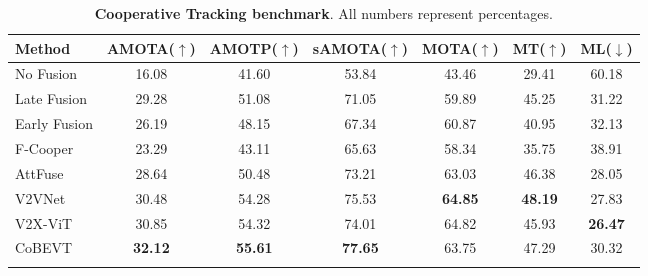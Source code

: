 \begin{table}[!tb]
\centering
\setlength{\tabcolsep}{10pt}
\begin{tabular}{l|c|c|c|c|c|c}
\hline
Method       & AMOTA($\uparrow$) & AMOTP($\uparrow$) & sAMOTA($\uparrow$) & MOTA($\uparrow$)  & MT($\uparrow$)    & ML($\downarrow$)    \\ \hline
No Fusion    & 16.08    & 41.60  & 53.84     & 43.46     &  29.41     &    60.18   \\\arrayrulecolor{lightgray}\hline
Late Fusion  & 29.28 & 51.08 & 71.05  & 59.89 & 45.25 & 31.22    \\\arrayrulecolor{lightgray}\hline
Early Fusion & 26.19 & 48.15 & 67.34  & 60.87  & 40.95 & 32.13 \\\arrayrulecolor{lightgray}\hline
F-Cooper~\cite{chen2019f}    &   23.29 &  43.11   & 65.63    &  58.34     &    35.75  &  38.91        \\
AttFuse~\cite{xu2022opv2v}      & 28.64 & 50.48 & 73.21 &  63.03 & 46.38 & 28.05 \\
V2VNet~\cite{wang2020v2vnet}       & 30.48 & 54.28 & 75.53  & \textbf{64.85}  & \textbf{48.19} & 27.83 \\
V2X-ViT~\cite{xu2022v2xvit}      &  30.85 & 54.32 & 74.01  & 64.82  & 45.93 & \textbf{26.47} \\
CoBEVT~\cite{xu2022cobevt}       & \textbf{32.12}  & \textbf{55.61} & \textbf{77.65}  & 63.75 & 47.29 & 30.32
\\ \arrayrulecolor{black}\hline
\end{tabular}
\vspace{-2mm}
\caption{\textbf{Cooperative Tracking benchmark}. All numbers represent percentages.}
\label{tab:track}
\vspace{-2mm}
\end{table}